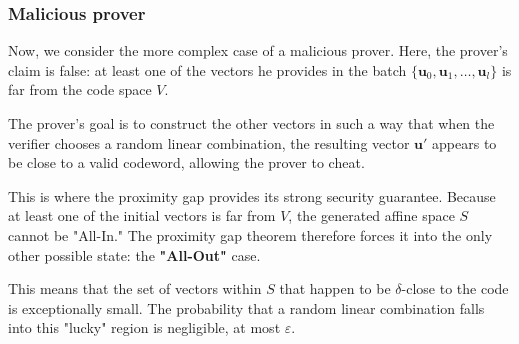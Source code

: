 \documentclass{article}
\begin{document}


\subsubsection{Malicious prover}







Now, we consider the more complex case of a malicious prover. Here, the prover's claim is false: at least one of the vectors he provides in the batch $\{\mathbf{u}_0, \mathbf{u}_1, \dots, \mathbf{u}_l\}$ is far from the code space $V$.

The prover's goal is to construct the other vectors in such a way that when the verifier chooses a random linear combination, the resulting vector $\mathbf{u}'$ appears to be close to a valid codeword, allowing the prover to cheat.

This is where the proximity gap provides its strong security guarantee. Because at least one of the initial vectors is far from $V$, the generated affine space $S$ cannot be "All-In." The proximity gap theorem therefore forces it into the only other possible state: the \textbf{"All-Out"} case.

This means that the set of vectors within $S$ that happen to be $\delta$-close to the code is exceptionally small. The probability that a random linear combination falls into this "lucky" region is negligible, at most $\varepsilon$.
\end{document}
